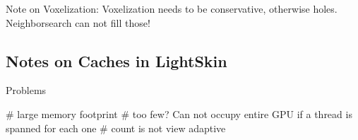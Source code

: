 \documentclass[thesis.tex]{subfiles}
\begin{document}
Note on Voxelization: Voxelization needs to be conservative, otherwise holes. Neighborsearch can not fill those!


\subsection{Notes on Caches in LightSkin}

Problems
\begin{easylist}[itemize]
# large memory footprint
# too few? Can not occupy entire GPU if a thread is spanned for each one
# count is not view adaptive
\end{easylist}
\end{document}
